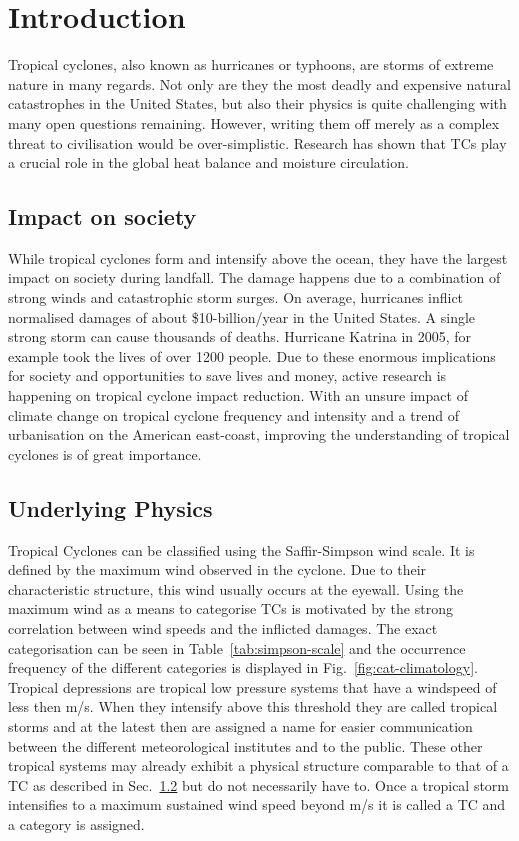 \chapter{Introduction}\label{sec:introduction}
Tropical cyclones, also known as hurricanes or typhoons, are storms of extreme nature in many regards. Not only are they the most deadly and expensive natural catastrophes in the United States, but also their physics is quite challenging with many open questions remaining.\cite{emanuel-summ}
However, writing them off merely as a complex threat to civilisation would be over-simplistic. Research has shown that TCs play a crucial role in the global heat balance and moisture circulation.\cite{moisture-transport}\cite{global-heat}

\section{Impact on society}\label{sec:society}
While tropical cyclones form and intensify above the ocean, they have the largest impact on society during landfall. The damage happens due to a combination of strong winds and catastrophic storm surges. On average, hurricanes inflict normalised damages of about \$10-billion/year in the United States.\cite{damage-norm} A single strong storm can cause thousands of deaths. Hurricane Katrina in 2005, for example took the lives of over 1200 people.\cite{hurr-2005}
Due to these enormous implications for society and opportunities to save lives and money, active research is happening on tropical cyclone impact reduction. With an unsure impact of climate change on tropical cyclone frequency and intensity and a trend of urbanisation on the American east-coast, improving the understanding of tropical cyclones is of great importance.

\section{Underlying Physics}\label{sec:physics}
Tropical Cyclones can be classified using the Saffir-Simpson wind scale. It is defined by the maximum wind observed in the cyclone. Due to their characteristic structure, this wind usually occurs at the eyewall. Using the maximum wind as a means to categorise TCs is motivated by the strong correlation between wind speeds and the inflicted damages.\cite{simpson} The exact categorisation can be seen in Table~\ref{tab:simpson-scale} and the occurrence frequency of the different categories is displayed in Fig.~\ref{fig:cat-climatology}. Tropical depressions are tropical low pressure systems that have a windspeed of less then \unit[17]{m/s}. When they intensify above this threshold they are called tropical storms and at the latest then are assigned a name for easier communication between the different meteorological institutes and to the public. These other tropical systems may already exhibit a physical structure comparable to that of a TC as described in Sec.~\ref{sec:physics} but do not necessarily have to. Once a tropical storm intensifies to a maximum sustained wind speed beyond \unit[32]{m/s} it is called a TC and a category is assigned.

